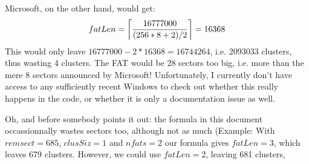 \documentclass[a4paper,12pt]{article}
\begin{document}
Microsoft, on the other hand, would get: $$fatLen = \left\lceil{
16777000 \over (256 * 8 + 2)/2} \right\rceil = 16368$$ This would only
leave $16777000-2*16368=16744264$, i.e. 2093033 clusters, thus wasting
4 clusters. The FAT would be 28 sectors too big, i.e. more than the
mere 8 sectors announced by Microsoft! Unfortunately, I currently
don't have access to any sufficiently recent Windows to check out
whether this really happens in the code, or whether it is only a
documentation issue as well.

Oh, and before somebody points it out: the formula in this document
occassionnally wastes sectors too, although not as much (Example: With
$remsect=685$, $clusSiz=1$ and $nfats=2$ our formula gives $fatLen=3$,
which leaves 679 clusters. However, we could use $fatLen=2$, leaving
681 clusters,
\end{document}
